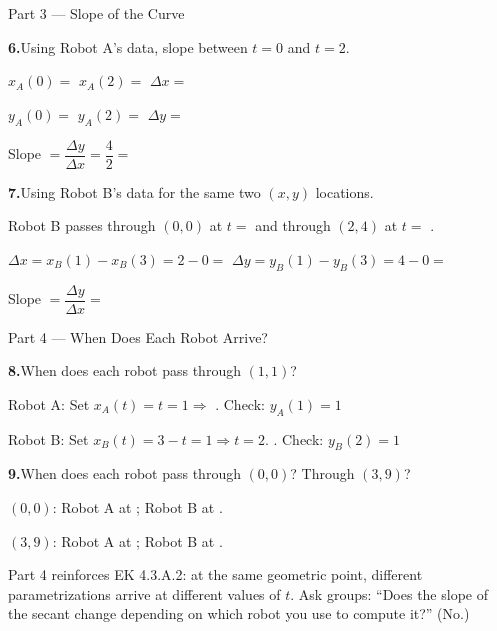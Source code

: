 \documentclass[10pt]{article}
\begin{document}
\begin{notesbox}{Part 3 --- Slope of the Curve}

\textbf{6.}\quad Using Robot A's data, slope between $t = 0$ and $t = 2$.

\vspace{4pt}
$x_A(0) = $  \qquad $x_A(2) = $  \qquad $\Delta x = $ 

$y_A(0) = $  \qquad $y_A(2) = $  \qquad $\Delta y = $ 

\vspace{4pt}
Slope $= \dfrac{\Delta y}{\Delta x} = \dfrac{4}{2} = $ 

\vspace{10pt}
\textbf{7.}\quad Using Robot B's data for the same two $(x,y)$ locations.

\vspace{4pt}
Robot B passes through $(0, 0)$ at $t = $ 
and through $(2, 4)$ at $t = $ .

$\Delta x = x_B(1) - x_B(3) = 2 - 0 = $  \qquad
$\Delta y = y_B(1) - y_B(3) = 4 - 0 = $ 

\vspace{4pt}
Slope $= \dfrac{\Delta y}{\Delta x} = $ 

\vspace{4pt}

\end{notesbox}

\vspace{0.08in}

\begin{notesbox}{Part 4 --- When Does Each Robot Arrive?}

\textbf{8.}\quad When does each robot pass through $(1, 1)$?

\vspace{4pt}
Robot A: Set $x_A(t) = t = 1 \Rightarrow$ . Check: $y_A(1) = 1$ \checkmark

Robot B: Set $x_B(t) = 3 - t = 1 \Rightarrow t = 2$. . Check: $y_B(2) = 1$ \checkmark

\vspace{0.10in}
\textbf{9.}\quad When does each robot pass through $(0, 0)$? Through $(3, 9)$?

\vspace{4pt}
$(0, 0)$: Robot A at ; Robot B at .

$(3, 9)$: Robot A at ; Robot B at .

\begin{teachernote}
  Part 4 reinforces EK 4.3.A.2: at the same geometric point, different parametrizations
  arrive at different values of $t$. Ask groups: ``Does the slope of the secant change
  depending on which robot you use to compute it?'' (No.)
\end{teachernote}

\end{notesbox}
\end{document}
